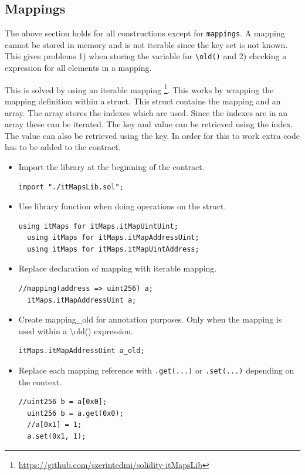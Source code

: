 \documentclass[a4paper]{article}
\begin{document}
\subsection{Mappings}
\label{sec:mapping}
The above section holds for all constructions except for \texttt{mappings}. A mapping cannot be stored in memory and is not iterable since the key set is not known. This gives problems 1) when storing the variable for \texttt{\textbackslash old()} and 2) checking a expression for all elements in a mapping. \par
This is solved by using an iterable mapping \footnote{\url{https://github.com/szerintedmi/solidity-itMapsLib}}. This works by wrapping the mapping definition within a struct. This struct contains the mapping and an array. The array stores the indexes which are used. Since the indexes are in an array these can be iterated. The key and value can be retrieved using the index. The value can also be retrieved using the key. In order for this to work extra code has to be added to the contract.
\begin{itemize}
  \item Import the library at the beginning of the contract.
  \begin{lstlisting}[breaklines=true, language=Solidity ]
  import "./itMapsLib.sol";
  \end{lstlisting}
  \item Use library function when doing operations on the struct.
  \begin{lstlisting}[breaklines=true, language=Solidity ]
  using itMaps for itMaps.itMapUintUint;
  using itMaps for itMaps.itMapAddressUint;
  using itMaps for itMaps.itMapUintAddress;
  \end{lstlisting}
  \item Replace declaration of mapping with iterable mapping.
  \begin{lstlisting}[breaklines=true, language=Solidity ]
  //mapping(address => uint256) a;
  itMaps.itMapAddressUint a; 
  \end{lstlisting}
  \item Create mapping\_old for annotation purposes. Only when the mapping is used within a \textbackslash old() expression.
  \begin{lstlisting}[breaklines=true, language=Solidity ]
  itMaps.itMapAddressUint a_old; 
  \end{lstlisting}
  \item Replace each mapping reference with \texttt{.get(...)} or \texttt{.set(...)} depending on the context.
  \begin{lstlisting}[breaklines=true, language=Solidity ]
  //uint256 b = a[0x0];
  uint256 b = a.get(0x0);
  //a[0x1] = 1;
  a.set(0x1, 1); 
  \end{lstlisting}
\end{itemize}
\end{document}
